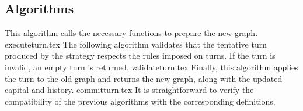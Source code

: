\subsection{Algorithms}
  This algorithm calls the necessary functions to prepare the new graph.
  {executeturn.tex}
  The following algorithm validates that the tentative turn produced by the strategy respects the rules imposed on turns.
  If the turn is invalid, an empty turn is returned.
  {validateturn.tex}
  Finally, this algorithm applies the turn to the old graph and returns the new graph, along with the updated capital and
  history.
  {committurn.tex}
  It is straightforward to verify the compatibility of the previous algorithms with the corresponding definitions.

